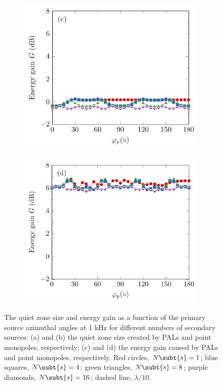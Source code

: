 \begin{figure}[!htb]
    \begin{subfigure}{0.49\textwidth}
        \centering
        \includegraphics[width = \textwidth]{fig/200325K_gain_PAL_v2.pdf}
    \end{subfigure}
    \begin{subfigure}{0.49\textwidth}
        \centering
        \includegraphics[width = \textwidth]{fig/200325K_gain_Monopole_v2.pdf}
    \end{subfigure}
    \caption{The quiet zone size and energy gain as a function of the primary source azimuthal angles at 1 kHz for different numbers of secondary sources: (a) and (b) the quiet zone size created by PALs and point monopoles, respectively; (c) and (d) the energy gain caused by PALs and point monopoles, respectively. Red circles, $N\subt{s} = 1$; blue squares, $N\subt{s} = 4$; green triangles, $N\subt{s} = 8$; purple diamonds, $N\subt{s} = 16$; dashed line, $\lambda/10$.}
    \label{fig:ancpalqz:diff_num_sec}
\end{figure}

